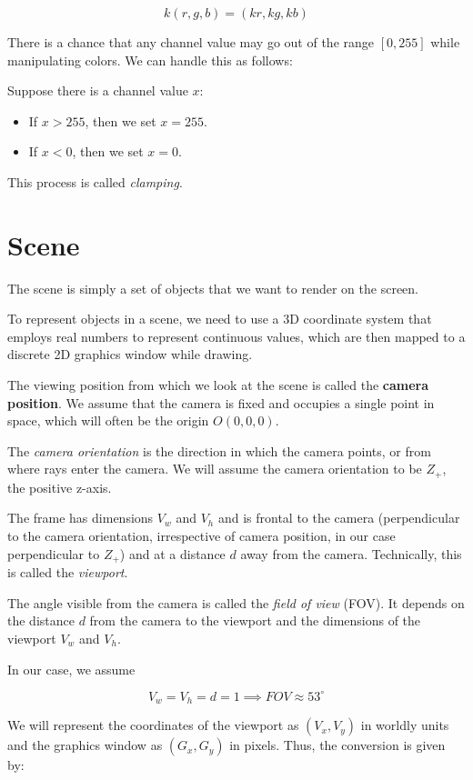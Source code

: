 \documentclass[conference]{IEEEtran}
\begin{document}
$$k (r, g, b) = (kr, kg, kb)$$

There is a chance that any channel value may go out of the range $[0,255]$ while manipulating colors. We can handle this as follows:

Suppose there is a channel value $x$:
\begin{itemize}
    \item If $x > 255$, then we set $x = 255$.
    \item If $x < 0$, then we set $x = 0$.
\end{itemize}

This process is called \textit{clamping}.

\section{Scene}

The scene is simply a set of objects that we want to render on the screen.

To represent objects in a scene, we need to use a 3D coordinate system that employs real numbers to represent continuous values, which are then mapped to a discrete 2D graphics window while drawing.

The viewing position from which we look at the scene is called the \textbf{camera position}. We assume that the camera is fixed and occupies a single point in space, which will often be the origin $O(0,0,0)$.

The \textit{camera orientation}\cite{peter} is the direction in which the camera points, or from where rays enter the camera. We will assume the camera orientation to be $Z_+$, the positive z-axis.

The frame has dimensions $V_w$ and $V_h$ and is frontal to the camera (perpendicular to the camera orientation, irrespective of camera position, in our case perpendicular to $Z_+$) and at a distance $d$ away from the camera. Technically, this is called the \textit{viewport}\cite{peter}.

The angle visible from the camera is called the \textit{field of view} (FOV).\cite{peter} It depends on the distance $d$ from the camera to the viewport and the dimensions of the viewport $V_w$ and $V_h$.

In our case, we assume 

$$V_w = V_h = d = 1 \implies FOV \approx 53^\circ$$

We will represent the coordinates of the viewport as $(V_x,V_y)$ in worldly units and the graphics window as $(G_x,G_y)$ in pixels. Thus, the conversion is given by:
\end{document}
